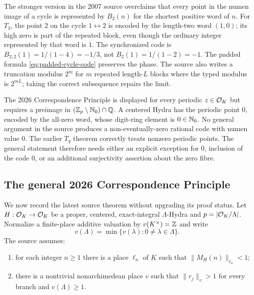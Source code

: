 \begin{sourceissue}
The stronger version in the 2007 source overclaims that every point in the
numen image of a cycle is represented by $B_2(n)$ for the shortest positive
word of $n$.  For $T_3$, the point $2$ on the cycle $1\leftrightarrow2$ is
encoded by the length-two word $(1,0)$; its high zero is part of the repeated
block, even though the ordinary integer represented by that word is $1$.
The synchronized code is $B_{2,2}(1)=1/(1-4)=-1/3$, not
$B_2(1)=1/(1-2)=-1$.  The padded formula
\cref{eq:padded-cycle-code} preserves the phase.  The source also writes a
truncation modulus $2^m$ for $m$ repeated length-$L$ blocks where the typed
modulus is $2^{mL}$; taking the correct subsequence repairs the limit.
\end{sourceissue}

\begin{sourceissue}
The 2026 Correspondence Principle is displayed for every periodic
$z\in\mathcal O_K$ but requires a preimage in
$(\mathbb Z_p\setminus\mathbb N_0)\cap\mathbb Q$.  A centered Hydra has the periodic point $0$,
encoded by the all-zero word, whose digit-ring element is $0\in\mathbb N_0$.
No general argument in the source produces a non-eventually-zero rational
code with numen value $0$.  The earlier $T_q$ theorem correctly treats
nonzero periodic points.  The general statement therefore needs either an
explicit exception for $0$, inclusion of the code $0$, or an additional
surjectivity assertion about the zero fibre.
\end{sourceissue}

\subsection{The general 2026 Correspondence Principle}

We now record the latest source theorem without upgrading its proof status.
Let $H:\mathcal O_K\to\mathcal O_K$ be a proper, centered, exact-integral $\Lambda$-Hydra and
$p=|\mathcal O_K/\Lambda|$.  Normalize a finite-place additive valuation by
$v(K^\times)=\mathbb Z$ and write
\[
 v(\Lambda)=\min\{v(\lambda):0\ne\lambda\in\Lambda\}.
\]
The source assumes:
\begin{enumerate}[label=\textup{(H\arabic*)}]
\item for each integer $n\geq1$ there is a place $\ell_n$ of $K$ such that
      $\|M_H(n)\|_{\ell_n}<1$;
\item there is a nontrivial nonarchimedean place $v$ such that
      $\|r_j\|_v>1$ for every branch and $v(\Lambda)\geq1$.
\end{enumerate}

